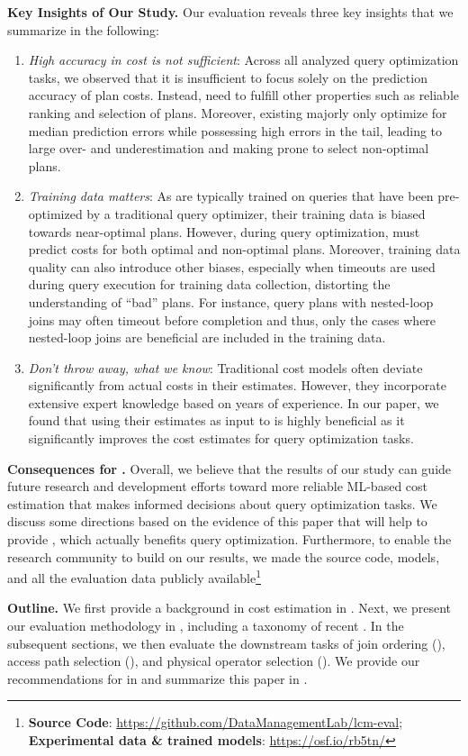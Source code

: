 \noindent\textbf{Key Insights of Our Study.}
Our evaluation reveals three key insights that we summarize in the following:
\begin{enumerate}[leftmargin=*, nosep]
    \item \textit{High accuracy in cost is not sufficient}: Across all analyzed query optimization tasks, we observed that it is insufficient to focus solely on the prediction accuracy of plan costs.
    Instead, \lcms need to fulfill other properties such as reliable ranking and selection of plans.
    Moreover, existing \lcms majorly only optimize for median prediction errors while possessing high errors in the tail, leading to large over- and underestimation and making \lcms prone to select non-optimal plans.
    \item \textit{Training data matters}:
    As \lcms are typically trained on queries that have been pre-optimized by a traditional query optimizer, their training data is biased towards near-optimal plans.
    However, during query optimization, \lcms must predict costs for both optimal and non-optimal plans. 
    Moreover, training data quality can also introduce other biases, especially when timeouts are used during query execution for training data collection, distorting the \lcms understanding of ``bad'' plans. 
    For instance, query plans with nested-loop joins may often timeout before completion and thus, only the cases where nested-loop joins are beneficial are included in the training data.
    \item \textit{Don't throw away, what we know}:
    Traditional cost models often deviate significantly from actual costs in their estimates. 
    However, they incorporate extensive expert knowledge based on years of experience.
In our paper, we found that using their estimates as input to \lcms is highly beneficial as it significantly improves the cost estimates for query optimization tasks.
\end{enumerate}
\noindent\textbf{Consequences for \lcms.} 
Overall, we believe that the results of our study can guide future research and development efforts toward more reliable ML-based cost estimation that makes informed decisions about query optimization tasks. 
We discuss some directions based on the evidence of this paper that will help to provide \lcms, which actually benefits query optimization.
Furthermore, to enable the research community to build on our results, we made the source code, models, and all the evaluation data publicly available\footnote{
\label{code_link}\textbf{Source Code}: \url{https://github.com/DataManagementLab/lcm-eval};\\
\label{data_link}\textbf{Experimental data \& trained models}:
\url{https://osf.io/rb5tn/}}

\noindent\textbf{Outline.}
We first provide a background in cost estimation in .
Next, we present our evaluation methodology in , including a taxonomy of recent \lcms.
In the subsequent sections, we then evaluate the downstream tasks of join ordering (), access path selection (), and physical operator selection ().
We provide our recommendations for \lcms in  and summarize this paper in .